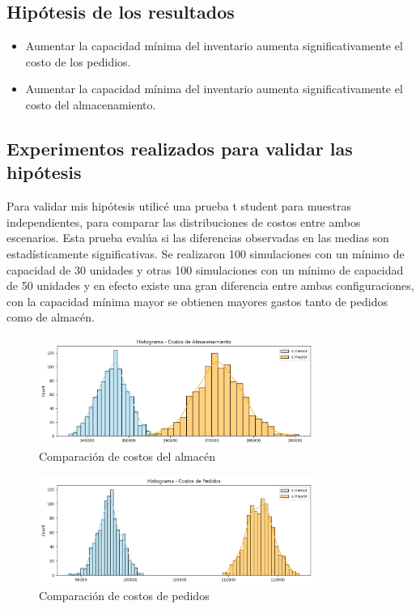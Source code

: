 \documentclass{article}
\begin{document}
\subsection{Hipótesis de los resultados}
    \begin{itemize}
        \item Aumentar la capacidad mínima del inventario aumenta significativamente el costo de los pedidios.
        \item Aumentar la capacidad mínima del inventario aumenta significativamente el costo del almacenamiento.
    \end{itemize}
\subsection{Experimentos realizados para validar las hipótesis}
Para validar mis hipótesis utilicé una prueba t student para muestras independientes, para comparar las distribuciones de costos entre ambos escenarios. Esta prueba evalúa si las diferencias observadas en las medias son estadísticamente significativas. Se realizaron 100 simulaciones con un mínimo de capacidad de 30 unidades y otras 100 simulaciones con un mínimo de capacidad de 50 unidades y en efecto existe una gran diferencia entre ambas configuraciones, con la capacidad mínima mayor se obtienen mayores gastos tanto de pedidos como de almacén.

\begin{figure}[h]
    \centering
    \includegraphics[width=0.8\textwidth]{images/CostosAlmacen.png}
    \caption{Comparación de costos del almacén}
\end{figure}

\begin{figure}[h]
    \centering
    \includegraphics[width=0.8\textwidth]{images/CostosPedidos.png}
    \caption{Comparación de costos de pedidos}
\end{figure}
\end{document}
